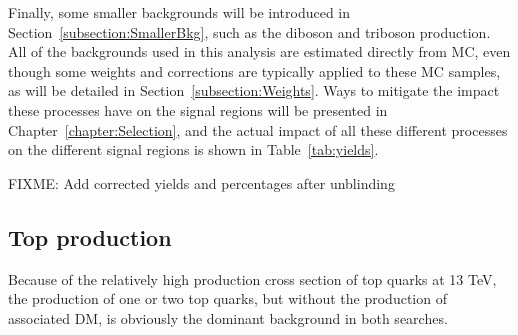 \documentclass[a4paper, 10pt, openright]{report}
\begin{document}
Finally, some smaller backgrounds will be introduced in Section~\ref{subsection:SmallerBkg}, such as the diboson and triboson production. All of the backgrounds used in this analysis are estimated directly from \ac{MC}, even though some weights and corrections are typically applied to these \ac{MC} samples, as will be detailed in Section~\ref{subsection:Weights}. Ways to mitigate the impact these processes have on the signal regions will be presented in Chapter~\ref{chapter:Selection}, and the actual impact of all these different processes on the different signal regions is shown in Table~\ref{tab:yields}.

\begin{table}
\begin{center}
\caption{Number of yields and percentage of different processes in some of the 2018 signal regions.}
\label{tab:yields}
\end{center}
\end{table}	

\color{red} FIXME: Add corrected yields and percentages after unblinding \color{black}

\subsection{Top production}

Because of the relatively high production cross section of top quarks at 13 TeV, the production of one or two top quarks, but without the production of associated \ac{DM}, is obviously the dominant background in both searches. 
\end{document}
